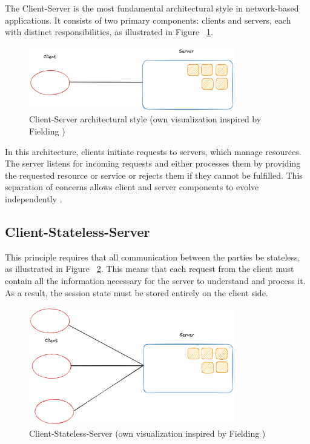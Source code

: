 The Client-Server is the most fundamental architectural style in network-based applications. It consists of two primary components: clients and servers, each with distinct responsibilities, as illustrated in Figure ~\ref{fig:client-server}.

\begin{figure}[!h]
\centering
\includegraphics[width=0.8\textwidth, keepaspectratio]{figures/client-server.png}
\caption{Client-Server architectural style (own visualization inspired by Fielding \cite{fielding2000})}
\label{fig:client-server}
\end{figure}

In this architecture, clients initiate requests to servers, which manage resources. The server listens for incoming requests and either processes them by providing the requested resource or service or rejects them if they cannot be fulfilled. This separation of concerns allows client and server components to evolve independently \cite{sinha1992}.

\subsection{Client-Stateless-Server}

This principle requires that all communication between the parties be stateless, as illustrated in Figure ~\ref{fig:stateless}. This means that each request from the client must contain all the information necessary for the server to understand and process it\cite{MESBAH20082194}. As a result, the session state must be stored entirely on the client side.\cite[Section 3.4.1.]{fielding2000}

\begin{figure}[!h]
\centering
\includegraphics[width=0.8\textwidth, keepaspectratio]{figures/stateless.png}
\caption{Client-Stateless-Server (own visualization inspired by Fielding \cite{fielding2000})}
\label{fig:stateless}
\end{figure}


